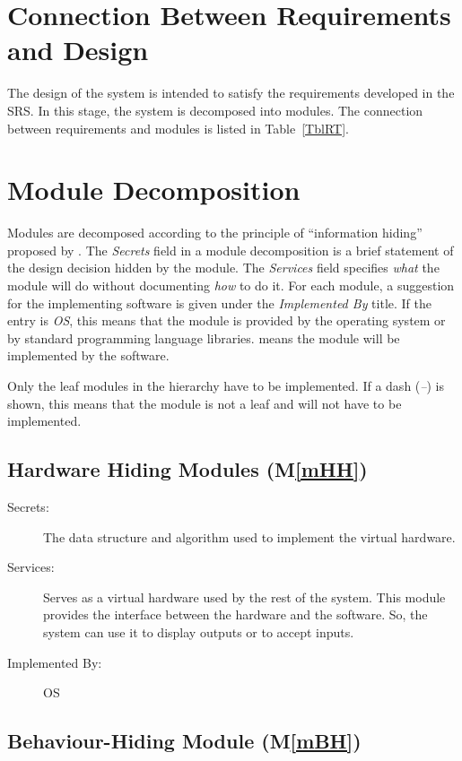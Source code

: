 \documentclass[12pt, titlepage]{article}
\newcommand{\mref}[1]{M\ref{#1}}
\begin{document}
\section{Connection Between Requirements and Design} \label{SecConnection}

The design of the system is intended to satisfy the requirements developed in
the SRS. In this stage, the system is decomposed into modules. The connection
between requirements and modules is listed in Table~\ref{TblRT}.

\section{Module Decomposition} \label{SecMD}

Modules are decomposed according to the principle of ``information hiding''
proposed by \citet{ParnasEtAl1984}. The \emph{Secrets} field in a module
decomposition is a brief statement of the design decision hidden by the
module. The \emph{Services} field specifies \emph{what} the module will do
without documenting \emph{how} to do it. For each module, a suggestion for the
implementing software is given under the \emph{Implemented By} title. If the
entry is \emph{OS}, this means that the module is provided by the operating
system or by standard programming language libraries.  \emph{\progname{}} means the
module will be implemented by the \progname{} software.

Only the leaf modules in the hierarchy have to be implemented. If a dash
(\emph{--}) is shown, this means that the module is not a leaf and will not have
to be implemented.

\subsection{Hardware Hiding Modules (\mref{mHH})}

\begin{description}
\item[Secrets:]The data structure and algorithm used to implement the virtual
  hardware.
\item[Services:]Serves as a virtual hardware used by the rest of the
  system. This module provides the interface between the hardware and the
  software. So, the system can use it to display outputs or to accept inputs.
\item[Implemented By:] OS
\end{description}

\subsection{Behaviour-Hiding Module (\mref{mBH})}
\end{document}
